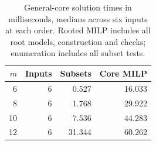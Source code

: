 \begin{table}[H]
\caption{General-core solution times in milliseconds, medians across six inputs at each order. Rooted MILP includes all root models, construction and checks; enumeration includes all subset tests.}\label{tab:general}
\centering\begin{tabular}{r r r r}
\hline $m$ & Inputs & Subsets & Core MILP\\\hline
6 & 6 & 0.527 & 16.033\\
8 & 6 & 1.768 & 29.922\\
10 & 6 & 7.536 & 44.283\\
12 & 6 & 31.344 & 60.262\\
\hline\end{tabular}\end{table}
